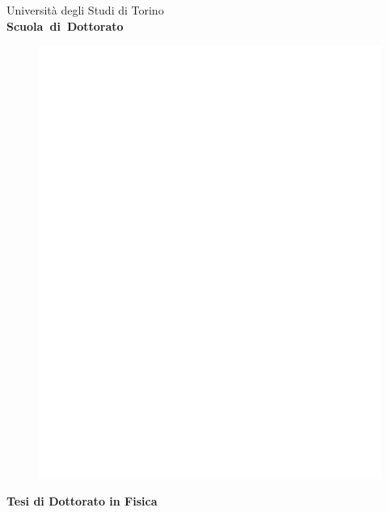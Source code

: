 \begin{titlepage}
\thispagestyle{empty}

\begin{center}

\begin{large}
Universit\`a degli Studi di Torino \\
\textbf{Scuola~di~Dottorato}
\end{large}

\hrulefill

\large{\strut}

\vspace{0.5cm}
\begin{figure}[h]
  \centering
  \includegraphics[width=.2\textheight]{Figures/logo_sigillo_verticale_neg.pdf}
\end{figure}

\vspace{1cm}

\Large{\textbf{Tesi di Dottorato in Fisica}}

\vspace{1cm}

\LARGE{\textbf{\thetitle}}\\

\vspace{1.5cm}

\Large{\textbf{\theauthor}}

\vspace*{\fill}

\end{center}
\end{titlepage}
